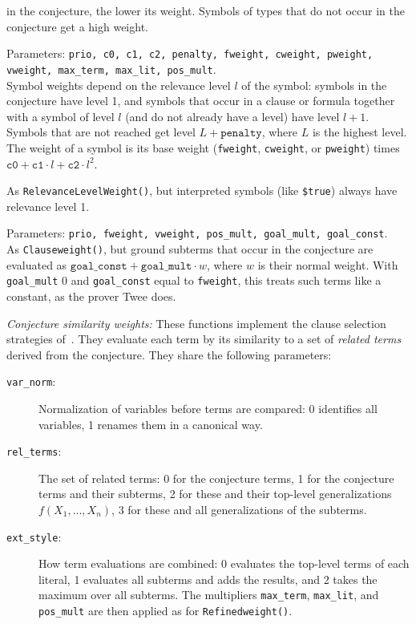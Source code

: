 \documentclass{report}
\begin{document}
\begin{description}
  in the conjecture, the lower its weight. Symbols of types that do
  not occur in the conjecture get a high weight.
\item[\texttt{RelevanceLevelWeight}:] Parameters: \texttt{prio, c0,
    c1, c2, penalty, fweight, cweight, pweight, vweight, max\_term,
    max\_lit, pos\_mult}.\\
  Symbol weights depend on the relevance level $l$ of the symbol:
  symbols in the conjecture have level 1, and symbols that occur in a
  clause or formula together with a symbol of level $l$ (and do not
  already have a level) have level $l+1$. Symbols that are not reached
  get level $L+\mathtt{penalty}$, where $L$ is the highest level. The
  weight of a symbol is its base weight (\texttt{fweight},
  \texttt{cweight}, or \texttt{pweight}) times $\mathtt{c0} +
  \mathtt{c1}\cdot l + \mathtt{c2}\cdot l^2$.
\item[\texttt{RelevanceLevelWeight2}:] As
  \texttt{RelevanceLevelWeight()}, but interpreted symbols (like
  \texttt{\$true}) always have relevance level 1.
\item[\texttt{GDWeight}:] Parameters: \texttt{prio, fweight, vweight,
    pos\_mult, goal\_mult, goal\_const}.\\
  As \texttt{Clauseweight()}, but ground subterms
  that occur in the conjecture are evaluated as $\mathtt{goal\_const}
  + \mathtt{goal\_mult}\cdot w$, where $w$ is their normal weight. With
  \texttt{goal\_mult} 0 and \texttt{goal\_const} equal to
  \texttt{fweight}, this treats such terms like a constant, as the
  prover Twee does.
\end{description}

\medskip
\noindent\emph{Conjecture similarity weights:} These functions
implement the clause selection strategies
of~\cite{JU:CICM-2016}. They evaluate each term by its similarity to a
set of \emph{related terms} derived from the conjecture. They share
the following parameters:
\begin{description}
\item[\texttt{var\_norm}:] Normalization of variables before terms
  are compared: 0 identifies all variables, 1 renames them in a
  canonical way.
\item[\texttt{rel\_terms}:] The set of related terms: 0 for the
  conjecture terms, 1 for the conjecture terms and their subterms, 2
  for these and their top-level generalizations $f(X_1,\ldots,X_n)$,
  3 for these and all generalizations of the subterms.
\item[\texttt{ext\_style}:] How term evaluations are combined: 0
  evaluates the top-level terms of each literal, 1 evaluates all
  subterms and adds the results, and 2 takes the maximum over all
  subterms. The multipliers \texttt{max\_term}, \texttt{max\_lit}, and
  \texttt{pos\_mult} are then applied as for
  \texttt{Refinedweight()}.
\end{description}
\end{document}
